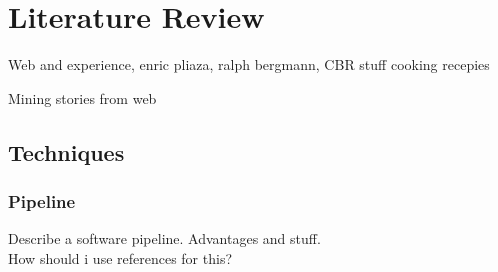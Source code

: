 
\chapter{Literature Review}

Web and experience, enric pliaza, ralph bergmann, CBR stuff cooking recepies

Mining stories from web


\section{Techniques}

\subsection{Pipeline} \label{pipeline}
Describe a software pipeline. Advantages and stuff.\\
How should i use references for this?


\cleardoublepage